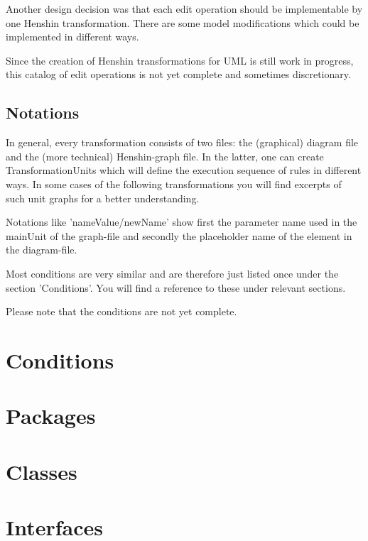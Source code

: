\documentclass[a4paper,DIV=10]{scrartcl}
\begin{document}
Another design decision was that each edit operation should be
implementable by one Henshin transformation.
 There are some model modifications which could be
implemented in different ways.

 Since the creation of Henshin transformations for UML is
still work in progress, this catalog of edit operations is
not yet complete and sometimes discretionary.




\subsection{Notations}

In general, every transformation consists of two files:
the (graphical) diagram file and the (more technical)
Henshin-graph file. In the latter, one can create
TransformationUnits which will define the execution
sequence of rules in different ways. In some cases of the
following transformations you will find excerpts of such
unit graphs for a better understanding.

Notations like 'nameValue/newName' show first the
parameter name used in the mainUnit of the graph-file and
secondly the placeholder name of the element in the
diagram-file.

Most conditions are very similar and are therefore just
listed once under the section 'Conditions'. You will find
a reference to these under relevant sections. 

Please note that the conditions are not yet complete.





\section{Conditions}


\newpage
\section{Packages}


\newpage
\section{Classes}


\newpage
\section{Interfaces}

\end{document}
